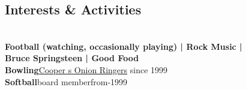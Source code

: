 \documentclass{article}
\begin{document}
\begin{below2}
  \section{Interests \& Activities}
    \\\vspace{1.7mm}
    \textbf{Football (watching, occasionally playing) | Rock Music |\\
    \belowspace 
    Bruce Springsteen | Good Food} \\
    \belowspace
    \textbf{Bowling}\hfill\href{https://kingofqueens.fandom.com/wiki/Doug_Heffernan}{\small Cooper s Onion Ringers} since 1999\\
    \belowspace
    \textbf{Softball}\hfill\href{https://kingofqueens.fandom.com/wiki/Doug_Heffernan}{\faMousePointer}\thinspace \thinspace board member\thinspace from-1999\\
    
~
\end{below2}
\newcommand{\eduspace}{\vspace*{0.85mm}}
\newcommand{\eduspaceII}{\vspace*{0.8mm}}
\newcommand{\jobspace}{\vspace*{-4.2mm}}
\vspace{-0.5mm}
\end{document}
